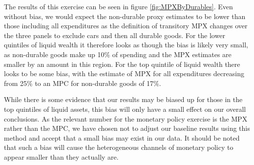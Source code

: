 \documentclass[titlepage]{\econtex}\newcommand{\texname}{ConsumptionHeterogeneity}
\begin{document}
The results of this exercise can be seen in figure \ref{fig:MPXByDurables}. Even without bias, we would expect the non-durable proxy estimates to be lower than those including all expenditures as the definition of transitory MPX changes over the three panels to exclude cars and then all durable goods. For the lower quintiles of liquid wealth it therefore looks as though the bias is likely very small, as non-durable goods make up 10\% of spending and the MPX estimates are smaller by an amount in this region. For the top quintile of liquid wealth there looks to be some bias, with the estimate of MPX for all expenditures decreasing from 25\% to an MPC for non-durable goods of 17\%.

While there is some evidence that our results may be biased up for those in the top quintiles of liquid assets, this bias will only have a small effect on our overall conclusions. As the relevant number for the monetary policy exercise is the MPX rather than the MPC, we have chosen not to adjust our baseline results using this method and accept that a small bias may exist in our data. It should be noted that such a bias will cause the heterogeneous channels of monetary policy to appear smaller than they actually are.
\end{document}
